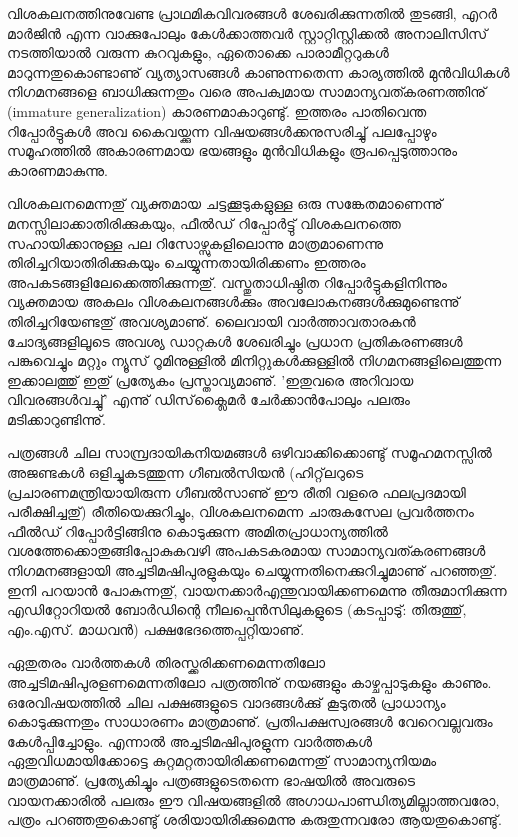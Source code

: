 വിശകലനത്തിനുവേണ്ട പ്രാഥമികവിവരങ്ങള്‍ ശേഖരിക്കുന്നതില്‍ തുടങ്ങി, എറര്‍ മാര്‍ജിന്‍ എന്ന വാക്കുപോലും 
കേള്‍ക്കാത്തവര്‍ സ്റ്റാറ്റിസ്റ്റിക്കല്‍ അനാലിസിസ് നടത്തിയാല്‍ വരുന്ന കുറവുകളും, ഏതൊക്കെ പാരാമീറ്ററുകള്‍ 
മാറുന്നതുകൊണ്ടാണു് വ്യത്യാസങ്ങള്‍ കാണുന്നതെന്ന കാര്യത്തില്‍ മുന്‍വിധികള്‍ നിഗമനങ്ങളെ ബാധിക്കുന്നതും വരെ 
അപക്വമായ സാമാന്യവത്കരണത്തിനു് (immature generalization) കാരണമാകാറുണ്ടു്. ഇത്തരം പാതിവെന്ത 
റിപ്പോര്‍ട്ടുകള്‍ അവ കൈവയ്ക്കുന്ന വിഷയങ്ങള്‍ക്കനുസരിച്ചു് പലപ്പോഴും സമൂഹത്തില്‍ അകാരണമായ ഭയങ്ങളും 
മുന്‍വിധികളും രൂപപ്പെടുത്താനും കാരണമാകുന്നു.

വിശകലനമെന്നതു് വ്യക്തമായ ചട്ടക്കൂടുകളുള്ള ഒരു സങ്കേതമാണെന്നു് മനസ്സിലാക്കാതിരിക്കുകയും, ഫീല്‍ഡ് 
റിപ്പോര്‍ട്ടു് വിശകലനത്തെ സഹായിക്കാനുള്ള പല റിസോഴ്സുകളിലൊന്നു മാത്രമാണെന്നു തിരിച്ചറിയാതിരിക്കുകയും 
ചെയ്യുന്നതായിരിക്കണം ഇത്തരം അപകടങ്ങളിലേക്കെത്തിക്കുന്നതു്. വസ്തുതാധിഷ്ഠിത റിപ്പോര്‍ട്ടുകളിനിന്നും 
വ്യക്തമായ അകലം വിശകലനങ്ങള്‍ക്കും അവലോകനങ്ങള്‍ക്കുമുണ്ടെന്നു് തിരിച്ചറിയേണ്ടതു് അവശ്യമാണു്. ലൈവായി 
വാര്‍ത്താവതാരകന്‍ ചോദ്യങ്ങളിലൂടെ അവശ്യ ഡാറ്റകള്‍ ശേഖരിച്ചും പ്രധാന പ്രതികരണങ്ങള്‍ പങ്കുവെച്ചും മറ്റും ന്യൂസ് 
റൂമിനുള്ളില്‍ മിനിറ്റുകള്‍ക്കുള്ളില്‍ നിഗമനങ്ങളിലെത്തുന്ന ഇക്കാലത്തു് ഇതു് പ്രത്യേകം പ്രസ്താവ്യമാണു്. 'ഇതുവരെ അറിവായ 
വിവരങ്ങള്‍വച്ചു്' എന്നു് ഡിസ്‌ക്ലൈമര്‍ ചേര്‍ക്കാന്‍പോലും പലരും മടിക്കാറുണ്ടിന്നു്.‌

പത്രങ്ങള്‍ ചില സാമ്പ്രദായികനിയമങ്ങള്‍ ഒഴിവാക്കിക്കൊണ്ടു് സമൂഹമനസ്സില്‍ അജണ്ടകള്‍ ഒളിച്ചുകടത്തുന്ന 
ഗീബല്‍സിയന്‍ (ഹിറ്റ്‌‌ലറുടെ പ്രചാരണമന്ത്രിയായിരുന്ന ഗീബല്‍സാണു് ഈ രീതി വളരെ ഫലപ്രദമായി പരീക്ഷിച്ചതു്) 
രീതിയെക്കുറിച്ചും, വിശകലനമെന്ന ചാരുകസേല പ്രവര്‍ത്തനം ഫീല്‍ഡ് റിപ്പോര്‍ട്ടിങ്ങിനു കൊടുക്കുന്ന 
അമിതപ്രാധാന്യത്തില്‍ വശത്തേക്കൊതുങ്ങിപ്പോകുകവഴി അപകടകരമായ സാമാന്യവത്കരണങ്ങള്‍ 
നിഗമനങ്ങളായി അച്ചടിമഷിപുരളുകയും ചെയ്യുന്നതിനെക്കുറിച്ചുമാണു് പറഞ്ഞതു്. ഇനി പറയാന്‍ പോകുന്നതു്, 
വായനക്കാര്‍എന്തുവായിക്കണമെന്നു തീരുമാനിക്കുന്ന എഡിറ്റോറിയല്‍ ബോര്‍ഡിന്റെ നീലപ്പെന്‍സിലുകളുടെ 
(കടപ്പാടു്: തിരുത്തു്, എം.എസ്. മാധവന്‍) പക്ഷഭേദത്തെപ്പറ്റിയാണു്.

ഏതുതരം വാര്‍ത്തകള്‍ തിരസ്ക്കരിക്കണമെന്നതിലോ അച്ചടിമഷിപുരളണമെന്നതിലോ പത്രത്തിനു് നയങ്ങളും 
കാഴ്ചപ്പാടുകളും കാണും. ഒരേവിഷയത്തില്‍ ചില പക്ഷങ്ങളുടെ വാദങ്ങള്‍ക്കു് കൂടുതല്‍ പ്രാധാന്യം കൊടുക്കുന്നതും 
സാധാരണം മാത്രമാണു്. പ്രതിപക്ഷസ്വരങ്ങള്‍ വേറെവല്ലവരും കേള്‍പ്പിച്ചോളും. എന്നാല്‍ അച്ചടിമഷിപുരളുന്ന 
വാര്‍ത്തകള്‍ ഏതുവിധമായിക്കോട്ടെ കുറ്റമറ്റതായിരിക്കണമെന്നതു് സാമാന്യനിയമം മാത്രമാണു്. പ്രത്യേകിച്ചും 
പത്രങ്ങളുടെതന്നെ ഭാഷയില്‍ അവരുടെ വായനക്കാരില്‍ പലരും ഈ വിഷയങ്ങളില്‍ 
അഗാധപാണ്ഡിത്യമില്ലാത്തവരോ, പത്രം പറഞ്ഞതുകൊണ്ടു് ശരിയായിരിക്കുമെന്നു കരുതുന്നവരോ ആയതുകൊണ്ടു്.

